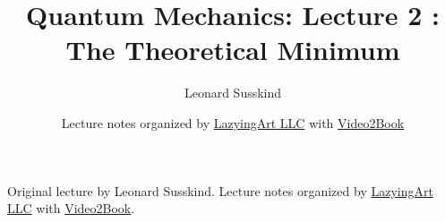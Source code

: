 \documentclass[11pt,oneside]{book}
\begin{document}
\frontmatter
\title{Quantum Mechanics: Lecture 2 : The Theoretical Minimum}
\author{Leonard Susskind}
\date{Lecture notes organized by \href{https://lazying.art}{LazyingArt LLC} with \href{https://github.com/lachlanchen/Video2Book}{Video2Book}}
\maketitle
\begin{center}
\small Original lecture by Leonard Susskind. Lecture notes organized by \href{https://lazying.art}{LazyingArt LLC} with \href{https://github.com/lachlanchen/Video2Book}{Video2Book}.
\end{center}
\clearpage
\mainmatter

\end{document}

